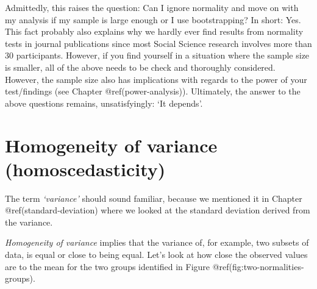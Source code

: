 \documentclass[
  letterpaper,
]{krantz}
\makeatletter
\newenvironment{Shaded}{\begin{snugshade}}{\end{snugshade}}
\newcommand{\AttributeTok}[1]{\textcolor[rgb]{0.40,0.45,0.13}{#1}}
\newcommand{\DecValTok}[1]{\textcolor[rgb]{0.68,0.00,0.00}{#1}}
\newcommand{\FloatTok}[1]{\textcolor[rgb]{0.68,0.00,0.00}{#1}}
\newcommand{\FunctionTok}[1]{\textcolor[rgb]{0.28,0.35,0.67}{#1}}
\newcommand{\NormalTok}[1]{\textcolor[rgb]{0.00,0.23,0.31}{#1}}
\newcommand{\SpecialCharTok}[1]{\textcolor[rgb]{0.37,0.37,0.37}{#1}}
\newcommand{\StringTok}[1]{\textcolor[rgb]{0.13,0.47,0.30}{#1}}
\newenvironment{kframe}{%
\medskip{}
\setlength{\fboxsep}{.8em}
 \def\at@end@of@kframe{}%
 \ifinner\ifhmode%
  \def\at@end@of@kframe{\end{minipage}}%
  \begin{minipage}{\columnwidth}%
 \fi\fi%
 \def\FrameCommand##1{\hskip\@totalleftmargin \hskip-\fboxsep
 \colorbox{shadecolor}{##1}\hskip-\fboxsep
     \hskip-\linewidth \hskip-\@totalleftmargin \hskip\columnwidth}%
 \MakeFramed {\advance\hsize-\width
   \@totalleftmargin\z@ \linewidth\hsize
   \@setminipage}}%
 {\par\unskip\endMakeFramed%
 \at@end@of@kframe}
\renewenvironment{Shaded}{\begin{kframe}}{\end{kframe}}
\makeatother
\begin{document}
Admittedly, this raises the question: Can I ignore normality and move on
with my analysis if my sample is large enough or I use bootstrapping? In
short: Yes. This fact probably also explains why we hardly ever find
results from normality tests in journal publications since most Social
Science research involves more than 30 participants. However, if you
find yourself in a situation where the sample size is smaller, all of
the above needs to be check and thoroughly considered. However, the
sample size also has implications with regards to the power of your
test/findings (see Chapter @ref(power-analysis)). Ultimately, the answer
to the above questions remains, unsatisfyingly: `It depends'.

\section{Homogeneity of variance
(homoscedasticity)}\label{homogeneity-of-variance}

The term \emph{`variance'} should sound familiar, because we mentioned
it in Chapter @ref(standard-deviation) where we looked at the standard
deviation derived from the variance.

\emph{Homogeneity of variance} implies that the variance of, for
example, two subsets of data, is equal or close to being equal. Let's
look at how close the observed values are to the mean for the two groups
identified in Figure @ref(fig:two-normalities-groups).

\begin{Shaded}
\end{Shaded}
\end{document}

